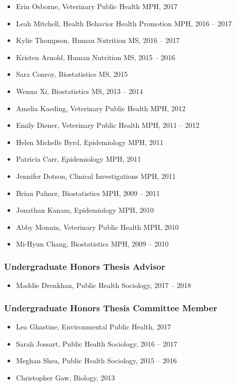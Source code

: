 \documentclass[
  english,
  letterpaper,
  DIV=11,
  numbers=noendperiod]{scrartcl}
\providecommand{\tightlist}{%
  \setlength{\itemsep}{0pt}\setlength{\parskip}{0pt}}
\begin{document}
\begin{itemize}
  Garrett Hunt, Program for Experienced Professionals (PEP) MPH, 2017
\item
  Erin Osborne, Veterinary Public Health MPH, 2017
\item
  Leah Mitchell, Health Behavior Health Promotion MPH, 2016 -- 2017
\item
  Kylie Thompson, Human Nutrition MS, 2016 -- 2017
\item
  Kristen Arnold, Human Nutrition MS, 2015 -- 2016
\item
  Sara Conroy, Biostatistics MS, 2015
\item
  Wenna Xi, Biostatistics MS, 2013 -- 2014
\item
  Amelia Kaeding, Veterinary Public Health MPH, 2012
\item
  Emily Diener, Veterinary Public Health MPH, 2011 -- 2012
\item
  Helen Michelle Byrd, Epidemiology MPH, 2011
\item
  Patricia Carr, Epidemiology MPH, 2011
\item
  Jennifer Dotson, Clinical Investigations MPH, 2011
\item
  Brian Palmer, Biostatistics MPH, 2009 -- 2011
\item
  Jonathan Kanam, Epidemiology MPH, 2010
\item
  Abby Monnin, Veterinary Public Health MPH, 2010
\item
  Mi-Hyun Chang, Biostatistics MPH, 2009 -- 2010
\end{itemize}

\subsubsection{Undergraduate Honors Thesis
Advisor}\label{undergraduate-honors-thesis-advisor}

\begin{itemize}
\tightlist
\item
  Maddie Drenkhan, Public Health Sociology, 2017 -- 2018
\end{itemize}

\subsubsection{Undergraduate Honors Thesis Committee
Member}\label{undergraduate-honors-thesis-committee-member}

\begin{itemize}
\tightlist
\item
  Lea Ghastine, Environmental Public Health, 2017
\item
  Sarah Jossart, Public Health Sociology, 2016 -- 2017
\item
  Meghan Shea, Public Health Sociology, 2015 -- 2016
\item
  Christopher Gaw, Biology, 2013
\end{itemize}
\end{document}
